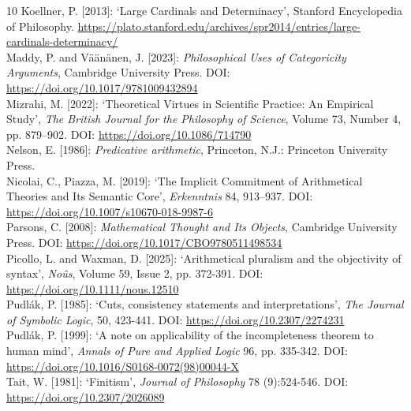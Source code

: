 \documentclass[a4paper,12pt]{amsart}
\theoremstyle{definition}
\numberwithin{equation}{section}
\begin{document}
\begin{thebibliography}{10}
Koellner, P. [2013]: `Large Cardinals and Determinacy',  Stanford Encyclopedia of Philosophy. \url{https://plato.stanford.edu/archives/spr2014/entries/large-cardinals-determinacy/}\\ 

Maddy, P. and  V\"{a}\"{a}n\"{a}nen, J. [2023]: \emph{Philosophical Uses of Categoricity Arguments}, Cambridge University Press.  DOI: \url{https://doi.org/10.1017/9781009432894}\\

 
Mizrahi, M. [2022]: `Theoretical Virtues in Scientific Practice: An Empirical Study', \emph{The British Journal for the Philosophy of Science}, Volume 73, Number 4, pp. 879–902. DOI: \url{https://doi.org/10.1086/714790}\\

Nelson, E. [1986]: \emph{Predicative arithmetic}, Princeton, N.J.: Princeton University Press.\\ 

Nicolai, C., Piazza, M. [2019]: `The Implicit Commitment of Arithmetical Theories and Its Semantic Core', \emph{Erkenntnis} 84, 913–937.  DOI: \url{https://doi.org/10.1007/s10670-018-9987-6}\\




Parsons, C. [2008]: \emph{Mathematical Thought and Its Objects}, Cambridge University Press.    DOI: \url{https://doi.org/10.1017/CBO9780511498534}\\


Picollo, L. and Waxman, D. [2025]: `Arithmetical pluralism and the objectivity of syntax', \emph{No\^{u}s}, Volume 59, Issue 2, pp. 372-391.  DOI: \url{https://doi.org/10.1111/nous.12510}\\



Pudl\'{a}k, P. [1985]: `Cuts, consistency statements and interpretations', \emph{The Journal of Symbolic Logic}, 50, 423-441. DOI: \url{https://doi.org/10.2307/2274231}\\

Pudl\'{a}k, P. [1999]: `A note on applicability of the incompleteness theorem to human mind', \emph{Annals of Pure and Applied Logic} 96, pp. 335-342. DOI: \url{https://doi.org/10.1016/S0168-0072(98)00044-X}\\


Tait, W.   [1981]: `Finitism',  \emph{Journal of Philosophy} 78 (9):524-546.  DOI: \url{https://doi.org/10.2307/2026089}\\


\end{thebibliography}
\end{document}

